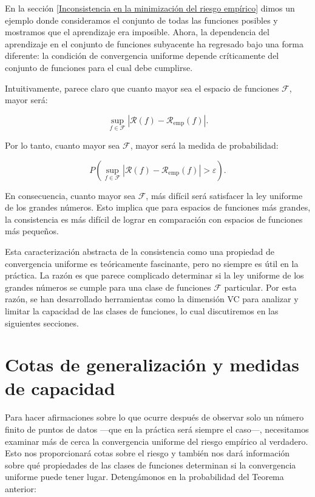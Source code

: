 \documentclass{report}
\begin{document}
En la sección \ref{Inconsistencia en la minimización del riesgo empírico} dimos un ejemplo donde consideramos el conjunto de todas las funciones posibles y mostramos
que el aprendizaje era imposible. Ahora, la dependencia del aprendizaje en el conjunto de funciones subyacente
ha regresado bajo una forma diferente: la condición de convergencia uniforme depende críticamente del conjunto
de funciones para el cual debe cumplirse.

Intuitivamente, parece claro que cuanto mayor sea el espacio de funciones \(\mathcal{F}\), mayor será:

\[
\sup_{f \in \mathcal{F}} |\mathcal{R}(f) - \mathcal{R}_{\text{emp}}(f)|.
\]

Por lo tanto, cuanto mayor sea \(\mathcal{F}\), mayor será la medida de probabilidad:

\[
P\left(\sup_{f \in \mathcal{F}} |\mathcal{R}(f) - \mathcal{R}_{\text{emp}}(f)| > \varepsilon \right).
\]

En consecuencia, cuanto mayor sea \(\mathcal{F}\), más difícil será satisfacer la ley uniforme de los grandes números.
Esto implica que para espacios de funciones más grandes, la consistencia es más difícil de lograr en comparación
con espacios de funciones más pequeños.


Esta caracterización abstracta de la consistencia como una propiedad de convergencia uniforme es teóricamente
fascinante, pero no siempre es útil en la práctica. La razón es que parece complicado determinar si la ley uniforme
de los grandes números se cumple para una clase de funciones \(\mathcal{F}\) particular. Por esta razón, se han desarrollado
herramientas como la dimensión VC para analizar y limitar la capacidad de las clases de funciones, lo cual discutiremos
en las siguientes secciones.

\section{Cotas de generalización y medidas de capacidad}

Para hacer afirmaciones sobre lo que ocurre después de observar solo un número finito de puntos de datos
—que en la práctica será siempre el caso—, necesitamos examinar más de cerca la
convergencia uniforme del riesgo empírico al verdadero. Esto nos proporcionará cotas sobre el riesgo y también nos dará información sobre
qué propiedades de las clases de funciones determinan si la convergencia uniforme puede tener lugar. Detengámonos
en la probabilidad del Teorema anterior:
\end{document}

